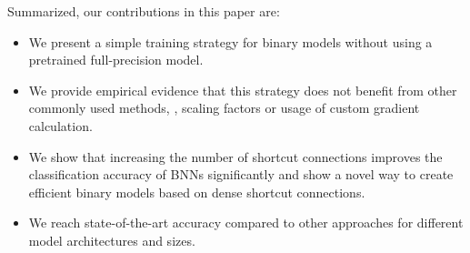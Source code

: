 \documentclass[10pt,twocolumn,letterpaper]{article}
\begin{document}
Summarized, our contributions in this paper are:
\begin{itemize}
\itemsep0em 
    \item We present a simple training strategy for binary models without using a pretrained full-precision model.
    \item We provide empirical evidence that this strategy does not benefit from other commonly used methods, \eg, scaling factors or usage of custom gradient calculation.
    \item We show that increasing the number of shortcut connections improves the classification accuracy of BNNs significantly and show a novel way to create efficient binary models based on dense shortcut connections.
    \item We reach state-of-the-art accuracy compared to other approaches for different model architectures and sizes.

\end{itemize}
\end{document}
